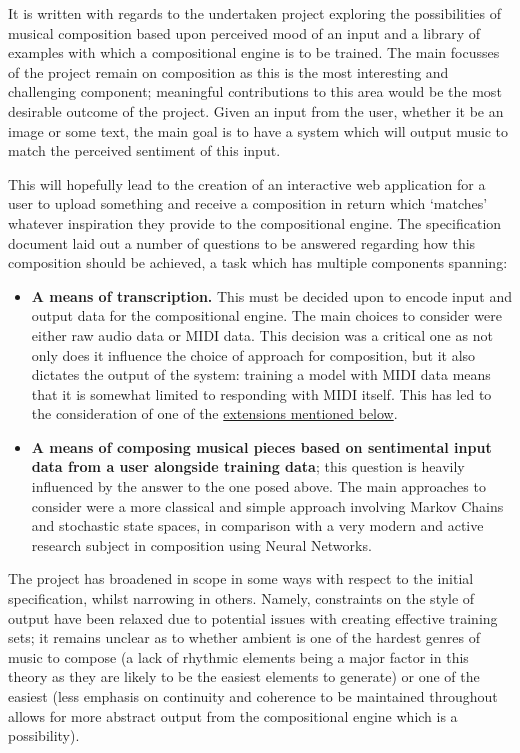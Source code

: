 \documentclass[12pt,]{article}
\providecommand{\tightlist}{%
  \setlength{\itemsep}{0pt}\setlength{\parskip}{0pt}}
\begin{document}
It is written with regards to the undertaken project exploring the
possibilities of musical composition based upon perceived mood of an
input and a library of examples with which a compositional engine is to
be trained. The main focusses of the project remain on composition as
this is the most interesting and challenging component; meaningful
contributions to this area would be the most desirable outcome of the
project. Given an input from the user, whether it be an image or some
text, the main goal is to have a system which will output music to match
the perceived sentiment of this input.

This will hopefully lead to the creation of an interactive web
application for a user to upload something and receive a composition in
return which `matches' whatever inspiration they provide to the
compositional engine. The specification document laid out a number of
questions to be answered regarding how this composition should be
achieved, a task which has multiple components spanning:

\begin{itemize}
\tightlist
\item
  \textbf{A means of transcription.} This must be decided upon to encode
  input and output data for the compositional engine. The main choices
  to consider were either raw audio data or MIDI data. This decision was
  a critical one as not only does it influence the choice of approach
  for composition, but it also dictates the output of the system:
  training a model with MIDI data means that it is somewhat limited to
  responding with MIDI itself. This has led to the consideration of one
  of the \protect\hyperlink{synthesiserparameters}{extensions mentioned
  below}.
\item
  \textbf{A means of composing musical pieces based on sentimental input
  data from a user alongside training data}; this question is heavily
  influenced by the answer to the one posed above. The main approaches
  to consider were a more classical and simple approach involving Markov
  Chains and stochastic state spaces, in comparison with a very modern
  and active research subject in composition using Neural Networks.
\end{itemize}

The project has broadened in scope in some ways with respect to the
initial specification, whilst narrowing in others. Namely, constraints
on the style of output have been relaxed due to potential issues with
creating effective training sets; it remains unclear as to whether
ambient is one of the hardest genres of music to compose (a lack of
rhythmic elements being a major factor in this theory as they are likely
to be the easiest elements to generate) or one of the easiest (less
emphasis on continuity and coherence to be maintained throughout allows
for more abstract output from the compositional engine which is a
possibility).
\end{document}
